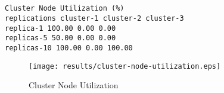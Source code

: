 \documentclass{elsart}
\begin{document}
\subsection{}

\begin{lstlisting}[caption={Cluster Node Utilization}]
Cluster Node Utilization (%)
replications cluster-1 cluster-2 cluster-3
replica-1 100.00 0.00 0.00
replicas-5 50.00 0.00 0.00
replicas-10 100.00 0.00 100.00
\end{lstlisting}

\begin{figure}[ht]
\centering
\texttt{[image: results/cluster-node-utilization.eps]}
\caption{Cluster Node Utilization}\label{fig:cluster-node-utilization.eps}
\end{figure}
\end{document}
